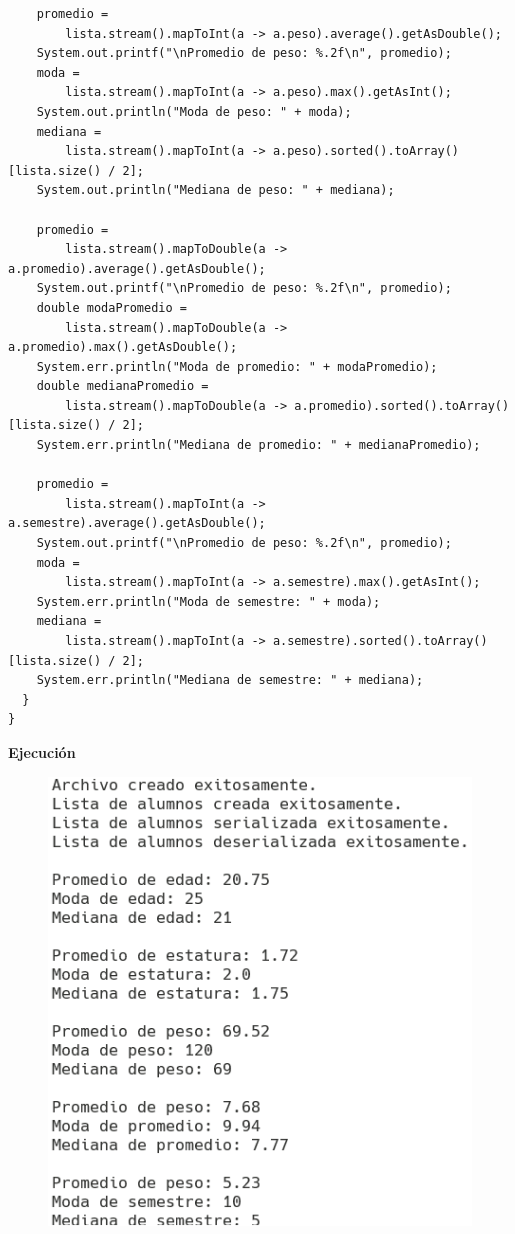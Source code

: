 \documentclass[11pt, twocolumn]{article}
\begin{document}
\begin{lstlisting}
    promedio =  
        lista.stream().mapToInt(a -> a.peso).average().getAsDouble();
    System.out.printf("\nPromedio de peso: %.2f\n", promedio);
    moda = 
        lista.stream().mapToInt(a -> a.peso).max().getAsInt();
    System.out.println("Moda de peso: " + moda);
    mediana = 
        lista.stream().mapToInt(a -> a.peso).sorted().toArray()[lista.size() / 2];
    System.out.println("Mediana de peso: " + mediana);

    promedio = 
        lista.stream().mapToDouble(a -> a.promedio).average().getAsDouble();
    System.out.printf("\nPromedio de peso: %.2f\n", promedio);
    double modaPromedio = 
        lista.stream().mapToDouble(a -> a.promedio).max().getAsDouble();
    System.err.println("Moda de promedio: " + modaPromedio);
    double medianaPromedio = 
        lista.stream().mapToDouble(a -> a.promedio).sorted().toArray()[lista.size() / 2];
    System.err.println("Mediana de promedio: " + medianaPromedio);

    promedio = 
        lista.stream().mapToInt(a -> a.semestre).average().getAsDouble();
    System.out.printf("\nPromedio de peso: %.2f\n", promedio);
    moda = 
        lista.stream().mapToInt(a -> a.semestre).max().getAsInt();
    System.err.println("Moda de semestre: " + moda);
    mediana = 
        lista.stream().mapToInt(a -> a.semestre).sorted().toArray()[lista.size() / 2];
    System.err.println("Mediana de semestre: " + mediana);
  }
}
  \end{lstlisting}

  \textbf{Ejecución}
  \begin{figure}[h!]
    \centering
    \includegraphics[width=0.75\columnwidth]{P3.png}
  \end{figure}
\end{document}
